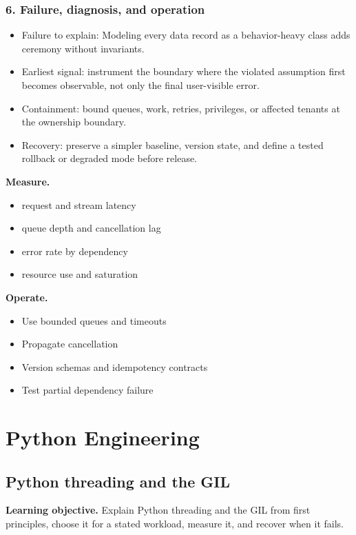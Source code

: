 \subsubsection*{6. Failure, diagnosis, and operation}
\begin{itemize}
\item Failure to explain: Modeling every data record as a behavior-heavy class adds ceremony without invariants.
\item Earliest signal: instrument the boundary where the violated assumption first becomes observable, not only the final user-visible error.
\item Containment: bound queues, work, retries, privileges, or affected tenants at the ownership boundary.
\item Recovery: preserve a simpler baseline, version state, and define a tested rollback or degraded mode before release.
\end{itemize}
\textbf{Measure.}\begin{itemize}
\item request and stream latency
\item queue depth and cancellation lag
\item error rate by dependency
\item resource use and saturation
\end{itemize}
\textbf{Operate.}\begin{itemize}
\item Use bounded queues and timeouts
\item Propagate cancellation
\item Version schemas and idempotency contracts
\item Test partial dependency failure
\end{itemize}
\clearpage\section{Python Engineering}
\subsection{Python threading and the GIL}
\textbf{Learning objective.} Explain Python threading and the GIL from first principles, choose it for a stated workload, measure it, and recover when it fails.
